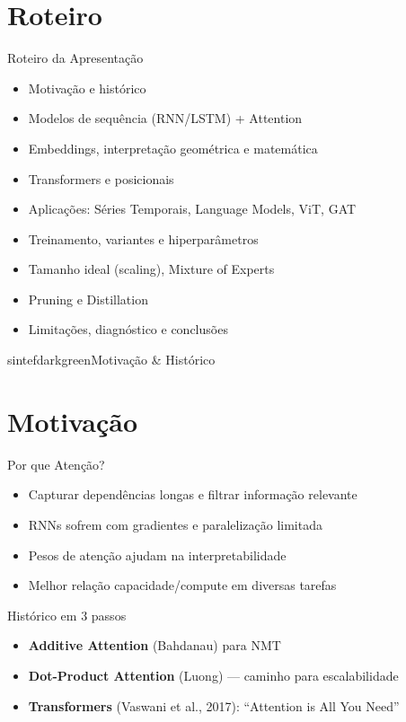 \documentclass{beamer}
\begin{document}
\section{Roteiro}
\begin{frame}{Roteiro da Apresentação}
	\begin{itemize}[<+->]
		\item Motivação e histórico
		\item Modelos de sequência (RNN/LSTM) + Attention
		\item Embeddings, interpretação geométrica e matemática
		\item Transformers e posicionais
		\item Aplicações: Séries Temporais, Language Models, ViT, GAT
		\item Treinamento, variantes e hiperparâmetros
		\item Tamanho ideal (scaling), Mixture of Experts
		\item Pruning e Distillation
		\item Limitações, diagnóstico e conclusões
	\end{itemize}
\end{frame}

\begin{chapter}{sintefdarkgreen}{Motivação \& Histórico}\end{chapter}

\section{Motivação}
\begin{frame}{Por que Atenção?}
	\begin{itemize}[<+->]
		\item Capturar dependências longas e filtrar informação relevante
		\item RNNs sofrem com gradientes e paralelização limitada
		\item Pesos de atenção ajudam na interpretabilidade
		\item Melhor relação capacidade/compute em diversas tarefas
	\end{itemize}
\end{frame}

\begin{frame}{Histórico em 3 passos}
	\begin{itemize}[<+->]
		\item \textbf{Additive Attention} (Bahdanau) para NMT
		\item \textbf{Dot-Product Attention} (Luong) — caminho para escalabilidade
		\item \textbf{Transformers} (Vaswani et al., 2017): “Attention is All You Need”
	\end{itemize}
\end{frame}
\end{document}
